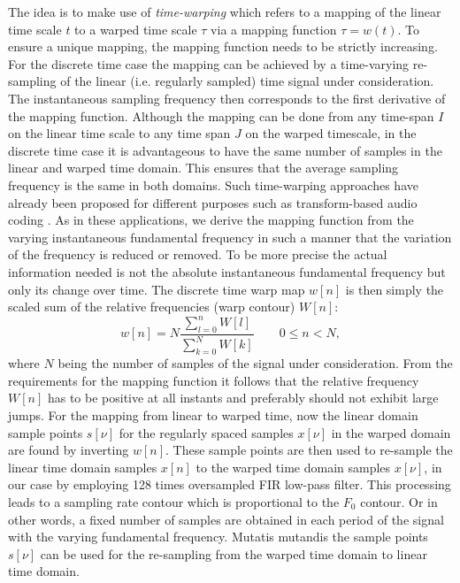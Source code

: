 The idea is to make use of \emph{time-warping} which refers to a mapping of the linear time scale $t$ to a warped time scale $\tau$ via a mapping function $\tau=w(t)$.
To ensure a unique mapping, the mapping function needs to be strictly increasing.
For the discrete time case the mapping can be achieved by a time-varying re-sampling of the linear (i.e. regularly sampled) time signal under consideration.
The instantaneous sampling frequency then corresponds to the first derivative of
the mapping function. Although the mapping can be done from any time-span
$I$ on the linear time scale to any time span $J$ on the warped timescale, in
the discrete time case it is advantageous to have the same number of samples
in the linear and warped time domain. This ensures that the average sampling
frequency is the same in both domains. Such time-warping approaches have already
been proposed for different purposes such as transform-based audio coding
\cite{edler09}. As in these applications, we derive the mapping function from
the varying instantaneous fundamental frequency in such a manner that the variation of the frequency is
reduced or removed. To be more precise the actual information needed is not
the absolute instantaneous fundamental frequency but only its change over time.
The discrete time warp map $w[n]$ is then simply the scaled sum of the relative
frequencies (warp contour) $W[n]$:
\begin{equation}\label{eq:time_warp}
w[n]=N \frac{\sum^n_{l=0}{W[l]}}{\sum^N_{k=0}{W[k]}}  \qquad 0\leq n<N,
\end{equation}
where $N$ being the number of samples of the signal under consideration.
From the requirements for the mapping function it follows that the relative
frequency $W[n]$ has to be positive at all instants and preferably should not
exhibit large jumps.
For the mapping from linear to warped time, now the linear domain sample points
$s[\nu]$ for the regularly spaced samples $x[\nu]$ in the warped domain are
found by inverting $w[n]$. These sample points are then used to re-sample the linear time
domain samples $x[n]$ to the warped time domain samples $x[\nu]$, in our case
by employing 128 times oversampled FIR low-pass filter. This processing leads to a sampling rate contour which is proportional to the $F_0$ contour. Or in other words, a fixed number of samples are obtained in each period of the signal with the varying fundamental frequency. Mutatis mutandis the sample points $s[\nu]$ can be used for the re-sampling from the warped time domain to linear time domain. \\

